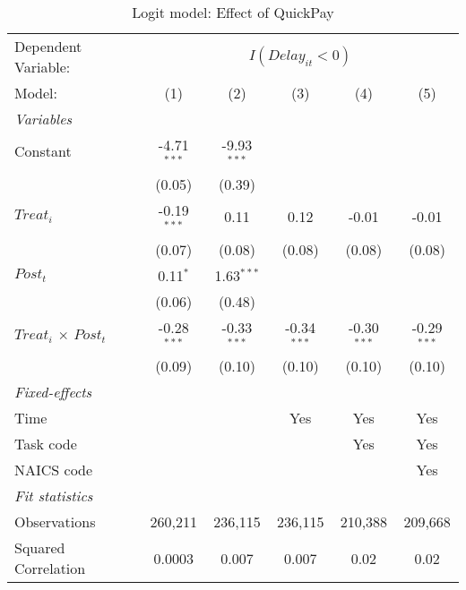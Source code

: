 \documentclass[
]{article}
\begin{document}
\begin{table}[htbp]
   \caption{Logit model: Effect of QuickPay}
   \centering
   \begin{tabular}{lccccc}
      \tabularnewline \midrule \midrule
      Dependent Variable: & \multicolumn{5}{c}{$I(Delay_{it}<0)$}\\
      Model:                       & (1)           & (2)           & (3)           & (4)           & (5)\\  
      \midrule
      \emph{Variables}\\
      Constant                     & -4.71$^{***}$ & -9.93$^{***}$ &               &               &   \\   
                                   & (0.05)        & (0.39)        &               &               &   \\   
      $Treat_i$                    & -0.19$^{***}$ & 0.11          & 0.12          & -0.01         & -0.01\\   
                                   & (0.07)        & (0.08)        & (0.08)        & (0.08)        & (0.08)\\   
      $Post_t$                     & 0.11$^{*}$    & 1.63$^{***}$  &               &               &   \\   
                                   & (0.06)        & (0.48)        &               &               &   \\   
      $Treat_i$ $\times$ $Post_t$  & -0.28$^{***}$ & -0.33$^{***}$ & -0.34$^{***}$ & -0.30$^{***}$ & -0.29$^{***}$\\   
                                   & (0.09)        & (0.10)        & (0.10)        & (0.10)        & (0.10)\\   
      \midrule
      \emph{Fixed-effects}\\
      Time                         &               &               & Yes           & Yes           & Yes\\  
      Task code                    &               &               &               & Yes           & Yes\\  
      NAICS code                   &               &               &               &               & Yes\\  
      \midrule
      \emph{Fit statistics}\\
      Observations                 & 260,211       & 236,115       & 236,115       & 210,388       & 209,668\\  
      Squared Correlation          & 0.0003        & 0.007         & 0.007         & 0.02          & 0.02\\  

\end{tabular}
\end{table}
\end{document}
